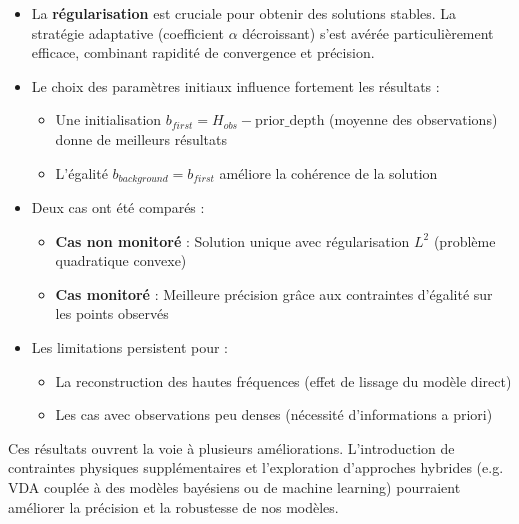 \documentclass{article}
\begin{document}
\begin{itemize}
    \item La \textbf{régularisation} est cruciale pour obtenir des solutions stables. La stratégie adaptative (coefficient $\alpha$ décroissant) s'est avérée particulièrement efficace, combinant rapidité de convergence et précision.

    \item Le choix des paramètres initiaux influence fortement les résultats :
    \begin{itemize}
        \item Une initialisation $b_{first} = H_{obs} - \text{prior\_depth}$ (moyenne des observations) donne de meilleurs résultats
        \item L'égalité $b_{background} = b_{first}$ améliore la cohérence de la solution
    \end{itemize}

    \item Deux cas ont été comparés :
    \begin{itemize}
        \item \textbf{Cas non monitoré} : Solution unique avec régularisation $L^2$ (problème quadratique convexe)
        \item \textbf{Cas monitoré} : Meilleure précision grâce aux contraintes d'égalité sur les points observés
    \end{itemize}

    \item Les limitations persistent pour :
    \begin{itemize}
        \item La reconstruction des hautes fréquences (effet de lissage du modèle direct)
        \item Les cas avec observations peu denses (nécessité d'informations a priori)
    \end{itemize}
\end{itemize}


\medskip

Ces résultats ouvrent la voie à plusieurs améliorations. L’introduction de contraintes physiques supplémentaires et l’exploration d’approches hybrides (e.g. VDA couplée à des modèles bayésiens ou de machine learning) pourraient améliorer la précision et la robustesse de nos modèles.
\end{document}
